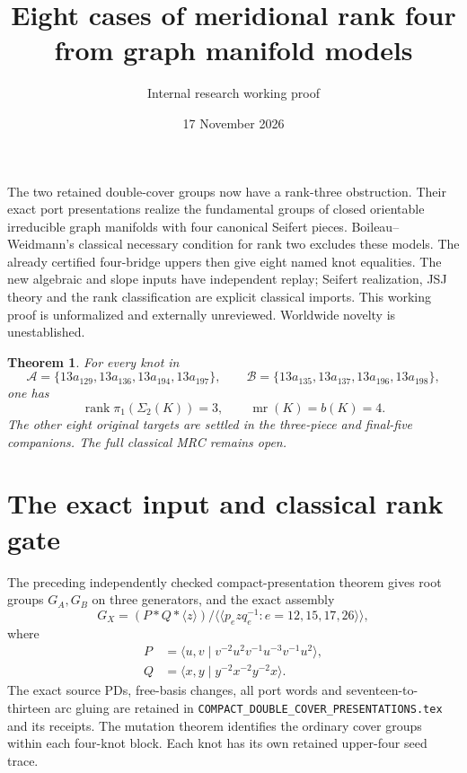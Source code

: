 \documentclass[11pt]{article}
\title{Eight cases of meridional rank four from graph manifold models}
\author{Internal research working proof}
\date{17 November 2026}
\newtheorem{theorem}{Theorem}
\newcommand{\rank}{\operatorname{rank}}
\newcommand{\mr}{\operatorname{mr}}
\begin{document}
\maketitle

The two retained double-cover groups now have a rank-three obstruction.
Their exact port presentations realize the fundamental groups of closed
orientable irreducible graph manifolds with four canonical Seifert pieces.
Boileau--Weidmann's classical necessary condition for rank two excludes
these models. The already certified four-bridge uppers then give eight
named knot equalities. The new algebraic and slope inputs have independent
replay; Seifert realization, JSJ theory and the rank classification are
explicit classical imports. This working proof is unformalized and
externally unreviewed. Worldwide novelty is unestablished.

\begin{theorem}\label{thm:knots}
For every knot in
\[
\mathcal A=\{13a_{129},13a_{136},13a_{194},13a_{197}\},\qquad
\mathcal B=\{13a_{135},13a_{137},13a_{196},13a_{198}\},
\]
one has
\[
 \rank\pi_1(\Sigma_2(K))=3,\qquad \mr(K)=b(K)=4.
\]
The other eight original targets are settled in the three-piece and
final-five companions. The full classical MRC remains open.
\end{theorem}

\section{The exact input and classical rank gate}

The preceding independently checked compact-presentation theorem gives
root groups $G_A,G_B$ on three generators, and the exact assembly
\[
 G_X=(P*Q*\langle z\rangle)/
 \langle\!\langle p_ezq_e^{-1}:e=12,15,17,26\rangle\!\rangle,
\]
where
\begin{align*}
P&=\langle u,v\mid v^{-2}u^2v^{-1}u^{-3}v^{-1}u^2\rangle,\\
Q&=\langle x,y\mid y^{-2}x^{-2}y^{-2}x\rangle.
\end{align*}
The exact source PDs, free-basis changes, all port words and
seventeen-to-thirteen arc gluing are retained in
\texttt{COMPACT\_DOUBLE\_COVER\_PRESENTATIONS.tex} and its receipts.
The mutation theorem identifies the ordinary cover groups within each
four-knot block. Each knot has its own retained upper-four seed trace.
\end{document}
